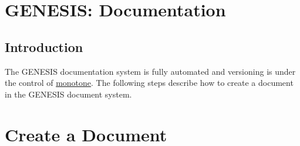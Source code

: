 \documentclass[12pt]{article}
\begin{document}
\section*{GENESIS: Documentation}

\subsection{Introduction}

The GENESIS documentation system is fully automated and versioning is under the control of \href{http://monotone.ca/}{monotone}.
The following steps describe how to create a document in the GENESIS document system. 

\section*{Create a Document}
\end{document}

